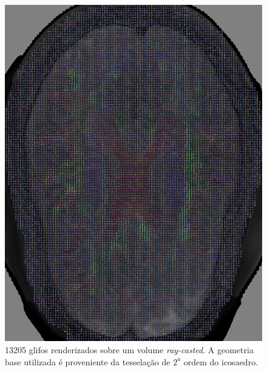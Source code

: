 \documentclass[
    12pt,                %
    oneside,            %
    a4paper,            %
    english,            %
    french,                %
    spanish,            %
    brazil                %
    ]{abntex2}
\begin{document}
 \begin{figure}[H]
     \centering
     \includegraphics[width=1.0\linewidth, angle=0]{figs/Renderizacao_glifos_evolucao/Adaptividade-multimodal/Fatia_42.png}
      \caption{13205 glifos renderizados sobre um volume \textit{ray-casted}. A geometria base utilizada é proveniente da tesselação de $2^a$ ordem do icosaedro.}
       \label{fig::qualidade_visual_longe_lowres}
 \end{figure}
 
\end{document}
